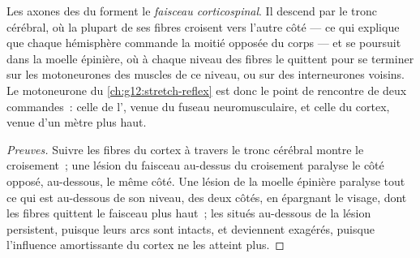 \begin{proposition}\label{prop:g12:brain-and-movement:pathway}
Les axones des  du  forment le \emph{faisceau
corticospinal}. Il descend par le tronc
cérébral, où la plupart de ses fibres croisent vers l'autre
côté --- ce qui explique que chaque hémisphère commande la moitié
opposée du corps --- et se poursuit dans la moelle épinière, où à
chaque niveau des fibres le quittent pour se terminer sur les
motoneurones des muscles de ce niveau, ou sur des interneurones
voisins. Le motoneurone du \cref{ch:g12:stretch-reflex} est donc le
point de rencontre de deux commandes~: celle de l', venue
du fuseau neuromusculaire, et celle du cortex, venue d'un mètre plus
haut.
\end{proposition}
\begin{proof}[Preuves]
Suivre les fibres du cortex à travers le tronc cérébral montre le
croisement~; une lésion du faisceau au-dessus du croisement paralyse
le côté opposé, au-dessous, le même côté. Une lésion de la moelle
épinière paralyse tout ce qui est au-dessous de son niveau, des deux
côtés, en épargnant le visage, dont les fibres quittent le faisceau
plus haut~; les  situés au-dessous de la lésion persistent,
puisque leurs arcs sont intacts, et deviennent exagérés, puisque
l'influence amortissante du cortex ne les atteint plus.
\end{proof}

